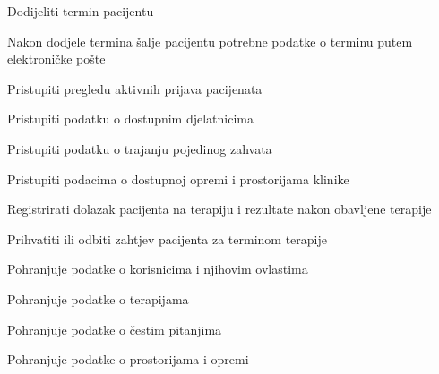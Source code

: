 \begin{packed_enum}
\begin{packed_enum}
				\end{packed_enum}

            \item  {}
				
				\begin{packed_enum}
					
					\item Dodijeliti termin pacijentu
                        \begin{packed_enum}
						
						\item Nakon dodjele termina šalje pacijentu potrebne podatke o terminu putem elektroničke pošte
				
					\end{packed_enum}
					\item Pristupiti pregledu aktivnih prijava pacijenata
                    \item Pristupiti podatku o dostupnim djelatnicima
                    \item Pristupiti podatku o trajanju pojedinog zahvata
                    \item Pristupiti podacima o dostupnoj opremi i prostorijama klinike
                    \item Registrirati dolazak pacijenta na terapiju i rezultate nakon obavljene terapije
                    \item Prihvatiti ili odbiti zahtjev pacijenta za terminom terapije
					
					
				\end{packed_enum}

            \item  {}
				
				\begin{packed_enum}
					
					\item Pohranjuje podatke o korisnicima i njihovim ovlastima
					\item Pohranjuje podatke o terapijama
                    \item Pohranjuje podatke o čestim pitanjima
                    \item Pohranjuje podatke o prostorijama i opremi
     
				\end{packed_enum}
            
			\end{packed_enum}
			
